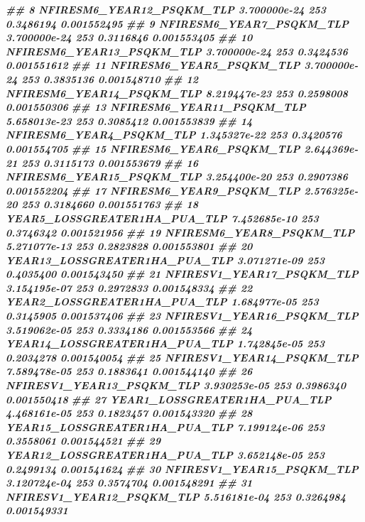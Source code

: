 \documentclass[10pt,landscape,a3paper]{article}
\newenvironment{Shaded}{\begin{snugshade}}{\end{snugshade}}
\newcommand{\DocumentationTok}[1]{\textcolor[rgb]{0.56,0.35,0.01}{\textbf{\textit{#1}}}}
\begin{document}
\begin{Shaded}
\begin{Highlighting}[]
\DocumentationTok{\#\# 8           NFIRESM6\_YEAR12\_PSQKM\_TLP 3.700000e{-}24    253 0.3486194 0.001552495}
\DocumentationTok{\#\# 9            NFIRESM6\_YEAR7\_PSQKM\_TLP 3.700000e{-}24    253 0.3116846 0.001553405}
\DocumentationTok{\#\# 10          NFIRESM6\_YEAR13\_PSQKM\_TLP 3.700000e{-}24    253 0.3424536 0.001551612}
\DocumentationTok{\#\# 11           NFIRESM6\_YEAR5\_PSQKM\_TLP 3.700000e{-}24    253 0.3835136 0.001548710}
\DocumentationTok{\#\# 12          NFIRESM6\_YEAR14\_PSQKM\_TLP 8.219447e{-}23    253 0.2598008 0.001550306}
\DocumentationTok{\#\# 13          NFIRESM6\_YEAR11\_PSQKM\_TLP 5.658013e{-}23    253 0.3085412 0.001553839}
\DocumentationTok{\#\# 14           NFIRESM6\_YEAR4\_PSQKM\_TLP 1.345327e{-}22    253 0.3420576 0.001554705}
\DocumentationTok{\#\# 15           NFIRESM6\_YEAR6\_PSQKM\_TLP 2.644369e{-}21    253 0.3115173 0.001553679}
\DocumentationTok{\#\# 16          NFIRESM6\_YEAR15\_PSQKM\_TLP 3.254400e{-}20    253 0.2907386 0.001552204}
\DocumentationTok{\#\# 17           NFIRESM6\_YEAR9\_PSQKM\_TLP 2.576325e{-}20    253 0.3184660 0.001551763}
\DocumentationTok{\#\# 18       YEAR5\_LOSSGREATER1HA\_PUA\_TLP 7.452685e{-}10    253 0.3746342 0.001521956}
\DocumentationTok{\#\# 19           NFIRESM6\_YEAR8\_PSQKM\_TLP 5.271077e{-}13    253 0.2823828 0.001553801}
\DocumentationTok{\#\# 20      YEAR13\_LOSSGREATER1HA\_PUA\_TLP 3.071271e{-}09    253 0.4035400 0.001543450}
\DocumentationTok{\#\# 21          NFIRESV1\_YEAR17\_PSQKM\_TLP 3.154195e{-}07    253 0.2972833 0.001548334}
\DocumentationTok{\#\# 22       YEAR2\_LOSSGREATER1HA\_PUA\_TLP 1.684977e{-}05    253 0.3145905 0.001537406}
\DocumentationTok{\#\# 23          NFIRESV1\_YEAR16\_PSQKM\_TLP 3.519062e{-}05    253 0.3334186 0.001553566}
\DocumentationTok{\#\# 24      YEAR14\_LOSSGREATER1HA\_PUA\_TLP 1.742845e{-}05    253 0.2034278 0.001540054}
\DocumentationTok{\#\# 25          NFIRESV1\_YEAR14\_PSQKM\_TLP 7.589478e{-}05    253 0.1883641 0.001544140}
\DocumentationTok{\#\# 26          NFIRESV1\_YEAR13\_PSQKM\_TLP 3.930253e{-}05    253 0.3986340 0.001550418}
\DocumentationTok{\#\# 27       YEAR1\_LOSSGREATER1HA\_PUA\_TLP 4.468161e{-}05    253 0.1823457 0.001543320}
\DocumentationTok{\#\# 28      YEAR15\_LOSSGREATER1HA\_PUA\_TLP 7.199124e{-}06    253 0.3558061 0.001544521}
\DocumentationTok{\#\# 29      YEAR12\_LOSSGREATER1HA\_PUA\_TLP 3.652148e{-}05    253 0.2499134 0.001541624}
\DocumentationTok{\#\# 30          NFIRESV1\_YEAR15\_PSQKM\_TLP 3.120724e{-}04    253 0.3574704 0.001548291}
\DocumentationTok{\#\# 31          NFIRESV1\_YEAR12\_PSQKM\_TLP 5.516181e{-}04    253 0.3264984 0.001549331}

\end{Highlighting}
\end{Shaded}
\end{document}
